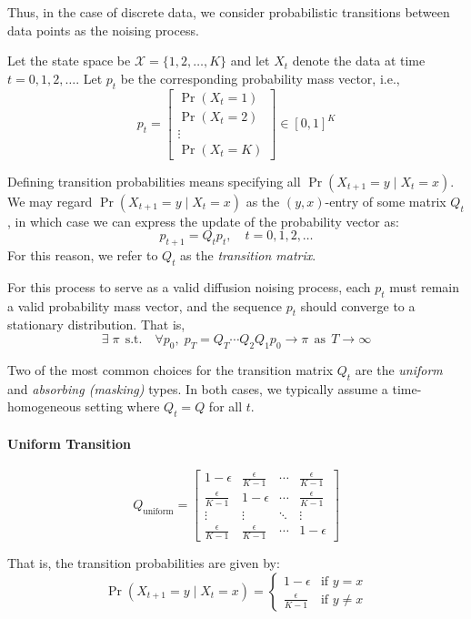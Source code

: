 \documentclass[11pt, a4paper]{article}
\begin{document}
Thus, in the case of discrete data, we consider probabilistic transitions between data points as the noising process.

Let the state space be \(\mathcal{X} = \{1, 2, \ldots, K\}\) and let \(X_t\) denote the data at time \(t = 0, 1, 2, \ldots\). Let \(p_t\) be the corresponding probability mass vector, i.e.,
\[
p_t= \left[ \begin{matrix}
    \Pr(X_t=1) \\
    \Pr(X_t=2) \\
    \vdots \\
    \Pr(X_t=K)
\end{matrix} \right] \in [0,1]^K
\]

Defining transition probabilities means specifying all \(\Pr(X_{t+1} = y \mid X_t = x)\). We may regard \(\Pr(X_{t+1} = y \mid X_t = x)\) as the \((y, x)\)-entry of some matrix \(Q_t\), in which case we can express the update of the probability vector as:
\[
p_{t+1} = Q_t p_t, \quad t = 0,1,2,\ldots
\]
For this reason, we refer to \(Q_t\) as the \emph{transition matrix}.

For this process to serve as a valid diffusion noising process, each \(p_t\) must remain a valid probability mass vector, and the sequence \(p_t\) should converge to a stationary distribution. That is,
\[
\exists \;\pi \;\,\text{s.t.}\quad \forall p_0, \; p_T = Q_T \cdots Q_2 Q_1 p_0 \rightarrow \pi \;\,\text{as} \;\, T \rightarrow \infty
\]

Two of the most common choices for the transition matrix \(Q_t\) are the \emph{uniform} and \emph{absorbing (masking)} types. In both cases, we typically assume a time-homogeneous setting where \(Q_t = Q\) for all \(t\).

\paragraph{Uniform Transition}

\[
Q_\text{uniform} = \left[ \begin{matrix}
    1-\epsilon & \frac{\epsilon}{K-1} & \cdots & \frac{\epsilon}{K-1} \\
    \frac{\epsilon}{K-1} & 1-\epsilon & \cdots & \frac{\epsilon}{K-1} \\
    \vdots & \vdots & \ddots & \vdots \\
    \frac{\epsilon}{K-1} & \frac{\epsilon}{K-1} & \cdots & 1-\epsilon
\end{matrix} \right]
\]

That is, the transition probabilities are given by:
\[
\Pr(X_{t+1} = y \mid X_t = x) = \begin{cases}
    1 - \epsilon & \text{if } y = x \\
    \frac{\epsilon}{K - 1} & \text{if } y \ne x
\end{cases}
\]
\end{document}
